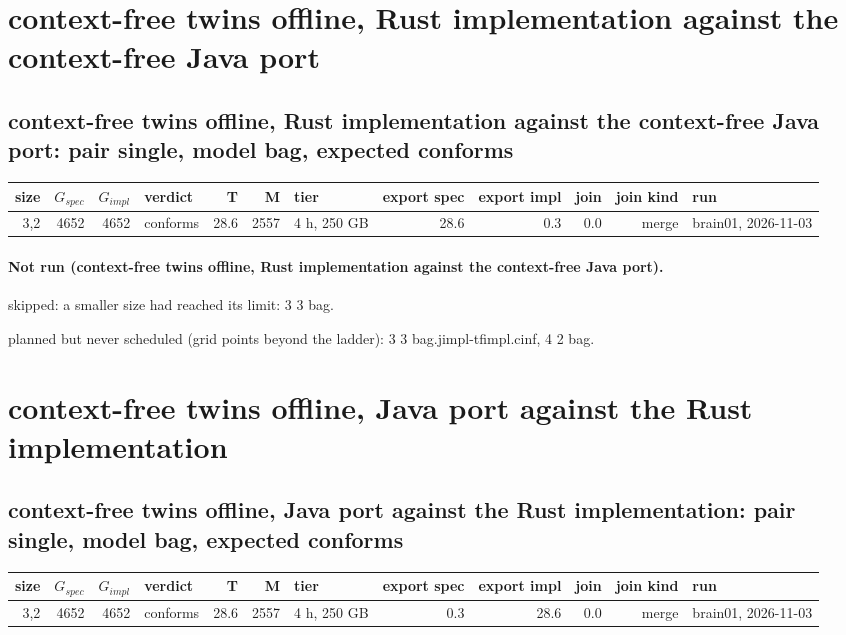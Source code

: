 \documentclass[10pt]{article}
\begin{document}
\section*{context-free twins offline, Rust implementation against the context-free Java port}
\subsection*{context-free twins offline, Rust implementation against the context-free Java port: pair \textsf{single}, model bag, expected conforms}
\begin{longtable}{@{}rrrlrrlrrrrl@{}}
\toprule
size & $G_{\mathit{spec}}$ & $G_{\mathit{impl}}$ & verdict & T & M & tier & export spec & export impl & join & join kind & run \\
\midrule
\endhead
\color{blue} 3,2 & 4652 & 4652 & conforms & 28.6 & 2557 & 4 h, 250 GB & 28.6 & 0.3 & 0.0 & merge & brain01, 2026-11-03 \\
\bottomrule
\end{longtable}
\paragraph{Not run (context-free twins offline, Rust implementation against the context-free Java port).}
skipped: a smaller size had reached its limit: 3 3 bag.\par
planned but never scheduled (grid points beyond the ladder): 3 3 bag.jimpl-tfimpl.cinf, 4 2 bag.\par
\section*{context-free twins offline, Java port against the Rust implementation}
\subsection*{context-free twins offline, Java port against the Rust implementation: pair \textsf{single}, model bag, expected conforms}
\begin{longtable}{@{}rrrlrrlrrrrl@{}}
\toprule
size & $G_{\mathit{spec}}$ & $G_{\mathit{impl}}$ & verdict & T & M & tier & export spec & export impl & join & join kind & run \\
\midrule
\endhead
\color{blue} 3,2 & 4652 & 4652 & conforms & 28.6 & 2557 & 4 h, 250 GB & 0.3 & 28.6 & 0.0 & merge & brain01, 2026-11-03 \\
\bottomrule
\end{longtable}
\end{document}
